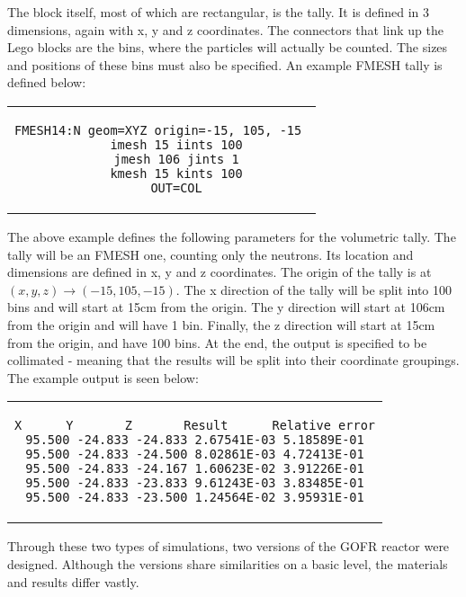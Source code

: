 The block itself, most of which are rectangular, is the tally. It is defined in 3 dimensions, again with x, y and z coordinates. The connectors that link up the Lego blocks are the bins, where the particles will actually be counted. The sizes and positions of these bins must also be specified. An example FMESH tally is defined below:

\begin{center}
\begin{tabular}{c}
\begin{lstlisting}
FMESH14:N geom=XYZ origin=-15, 105, -15 
	imesh 15 iints 100
	jmesh 106 jints 1
	kmesh 15 kints 100
	OUT=COL
\end{lstlisting}
\end{tabular}
\end{center}

The above example defines the following parameters for the volumetric tally. The tally will be an FMESH one, counting only the neutrons. Its location and dimensions are defined in x, y and z coordinates. The origin of the tally is at $(x,y,z)\rightarrow (-15,105,-15)$. The x direction of the tally will be split into 100 bins and will start at 15cm from the origin. The y direction will start at 106cm from the origin and will have 1 bin. Finally, the z direction will start at 15cm from the origin, and have 100 bins. At the end, the output is specified to be collimated - meaning that the results will be split into their coordinate groupings. The example output is seen below:

\begin{center}
\begin{tabular}{c}
\begin{lstlisting}
X      Y       Z       Result      Relative error
95.500 -24.833 -24.833 2.67541E-03 5.18589E-01
95.500 -24.833 -24.500 8.02861E-03 4.72413E-01
95.500 -24.833 -24.167 1.60623E-02 3.91226E-01
95.500 -24.833 -23.833 9.61243E-03 3.83485E-01
95.500 -24.833 -23.500 1.24564E-02 3.95931E-01
\end{lstlisting}
\end{tabular}
\end{center}

Through these two types of simulations, two versions of the GOFR reactor were designed. Although the versions share similarities on a basic level, the materials and results differ vastly.
